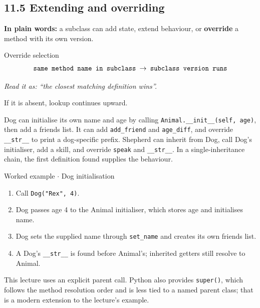 \documentclass[11pt]{article}
\begin{document}
\begin{keepsection}
\section{11.5 Extending and overriding}

\begin{plainbox}\textbf{In plain words:} a subclass can add state, extend behaviour, or \textbf{override} a method with its own version.\end{plainbox}

\begin{equationcard}{Override selection}
\[ \begin{gathered} \texttt{same method name in subclass \ensuremath{\to} subclass version runs} \end{gathered} \]
{\small \emph{Read it as: “the closest matching definition wins”.}\par If it is absent, lookup continues upward.}
\end{equationcard}

Dog can initialise its own name and age by calling \texttt{Animal.\_\_init\_\_(self, age)}, then add a friends list. It can add \texttt{add\_friend} and \texttt{age\_diff}, and override \texttt{\_\_str\_\_} to print a dog-specific prefix. Shepherd can inherit from Dog, call Dog’s initialiser, add a skill, and override \texttt{speak} and \texttt{\_\_str\_\_}. In a single-inheritance chain, the first definition found supplies the behaviour.

\begin{workedbox}{Worked example \ensuremath{\cdot} Dog initialisation}
\begin{enumerate}
\item Call \texttt{Dog("Rex", 4)}.
\item Dog passes age 4 to the Animal initialiser, which stores age and initialises name.
\item Dog sets the supplied name through \texttt{set\_name} and creates its own friends list.
\item A Dog’s \texttt{\_\_str\_\_} is found before Animal’s; inherited getters still resolve to Animal.
\end{enumerate}
\end{workedbox}

This lecture uses an explicit parent call. Python also provides \texttt{super()}, which follows the method resolution order and is less tied to a named parent class; that is a modern extension to the lecture’s example.


\end{keepsection}
\end{document}
